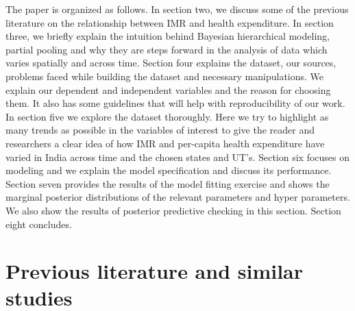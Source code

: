 \documentclass{article}
\begin{document}
The paper is organized as follows. In section two, we discuss some of the previous literature on the relationship between IMR and health expenditure. In section three, we briefly explain the intuition behind Bayesian hierarchical modeling, partial pooling and why they are steps forward in the analysis of data which varies spatially and across time. Section four explains the dataset, our sources, problems faced while building the dataset and necessary manipulations. We explain our dependent and independent variables and the reason for choosing them. It also has some guidelines that will help with reproducibility of our work. In section five we explore the dataset thoroughly. Here we try to highlight as many trends as possible in the variables of interest to give the reader and researchers a clear idea of how IMR and per-capita health expenditure have varied in India across time and the chosen states and UT's. Section six focuses on modeling and we explain the model specification and discuss its performance. Section seven provides the results of the model fitting exercise and shows the marginal posterior distributions of the relevant parameters and hyper parameters. We also show the results of posterior predictive checking in this section. Section eight concludes.\\

\section{Previous literature and similar studies}
\end{document}
